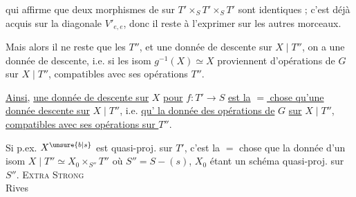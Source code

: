 qui affirme  que deux morphismes de  sur $T'\times_S T'\times_S T'$ sont identiques ; c'est déjà acquis sur la diagonale $V'_{e,e}$, donc il reste à l'exprimer sur les autres morceaux.

Mais alors il ne reste que les $T''$, et    une donnée de descente   sur $X\mid T''$, on a une donnée de descente, i.e. si les isom $g^{-1}(X)\simeq X$ proviennent d'opérations de $G$ sur $X\mid T''$, compatibles avec ses opérations   $T''$.

\uline{Ainsi}, \uline{une donnée de descente sur} $X$ \uline{pour} $f:T'\to S$ \uline{est la} \uline{$=$ chose qu'une donnée  descente sur} $X\mid T''$, i.e. \uline{qu'}\uline{ la donnée des opérations de} $G$ \uline{sur} $X\mid T''$, \uline{compatibles avec ses opérations sur $T''$}.

Si p.ex. $X^{\unsure{b|s}}$ est quasi-proj. sur $T'$, c'est la $=$ chose que la donnée d'un isom $X\mid T''\simeq X_0\times_{S''}T''$ où $S''=S-(s)$, $X_0$ étant un schéma quasi-proj. sur $S''$.
\textsc{Extra Strong}\\
 Rives
